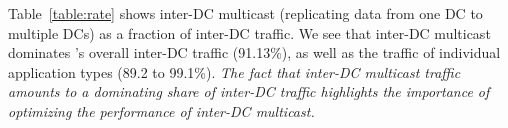 Table~\ref{table:rate} shows inter-DC multicast
(replicating data from one DC to multiple DCs) as
a fraction of inter-DC traffic.
We see that inter-DC multicast dominates \company's
overall inter-DC traffic (91.13\%), as well as
the traffic of individual application types (89.2 to 99.1\%).
{\em The fact that inter-DC multicast traffic
amounts to a dominating share of inter-DC traffic
highlights the importance of optimizing the
performance of inter-DC multicast.}


